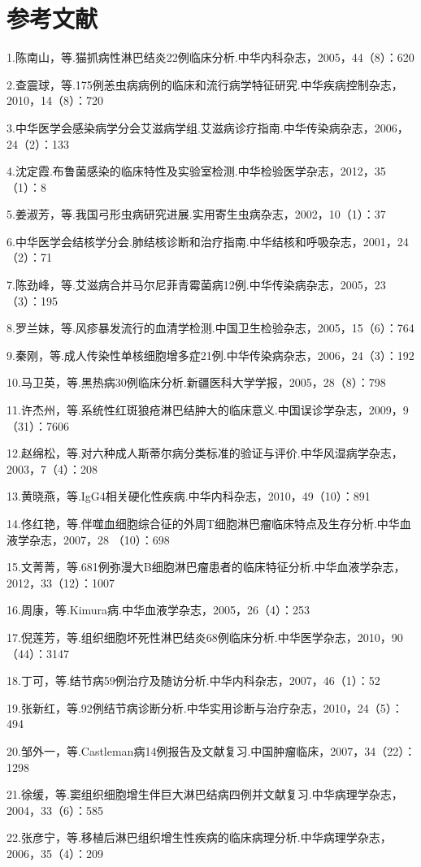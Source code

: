 \protect\hypertarget{text00255.html}{}{}

\section{参考文献}

1.陈南山，等.猫抓病性淋巴结炎22例临床分析.中华内科杂志，2005，44（8）：620

2.查震球，等.175例恙虫病病例的临床和流行病学特征研究.中华疾病控制杂志，2010，14（8）：720

3.中华医学会感染病学分会艾滋病学组.艾滋病诊疗指南.中华传染病杂志，2006，24（2）：133

4.沈定霞.布鲁菌感染的临床特性及实验室检测.中华检验医学杂志，2012，35（1）：8

5.姜淑芳，等.我国弓形虫病研究进展.实用寄生虫病杂志，2002，10（1）：37

6.中华医学会结核学分会.肺结核诊断和治疗指南.中华结核和呼吸杂志，2001，24（2）：71

7.陈劲峰，等.艾滋病合并马尔尼菲青霉菌病12例.中华传染病杂志，2005，23（3）：195

8.罗兰妹，等.风疹暴发流行的血清学检测.中国卫生检验杂志，2005，15（6）：764

9.秦刚，等.成人传染性单核细胞增多症21例.中华传染病杂志，2006，24（3）：192

10.马卫英，等.黑热病30例临床分析.新疆医科大学学报，2005，28（8）：798

11.许杰州，等.系统性红斑狼疮淋巴结肿大的临床意义.中国误诊学杂志，2009，9（31）：7606

12.赵绵松，等.对六种成人斯蒂尔病分类标准的验证与评价.中华风湿病学杂志，2003，7（4）：208

13.黄晓燕，等.IgG4相关硬化性疾病.中华内科杂志，2010，49（10）：891

14.佟红艳，等.伴噬血细胞综合征的外周T细胞淋巴瘤临床特点及生存分析.中华血液学杂志，2007，28
（10）：698

15.文菁菁，等.681例弥漫大B细胞淋巴瘤患者的临床特征分析.中华血液学杂志，2012，33（12）：1007

16.周康，等.Kimura病.中华血液学杂志，2005，26（4）：253

17.倪莲芳，等.组织细胞坏死性淋巴结炎68例临床分析.中华医学杂志，2010，90（44）：3147

18.丁可，等.结节病59例治疗及随访分析.中华内科杂志，2007，46（1）：52

19.张新红，等.92例结节病诊断分析.中华实用诊断与治疗杂志，2010，24（5）：494

20.邹外一，等.Castleman病14例报告及文献复习.中国肿瘤临床，2007，34（22）：1298

21.徐缓，等.窦组织细胞增生伴巨大淋巴结病四例并文献复习.中华病理学杂志，2004，33（6）：585

22.张彦宁，等.移植后淋巴组织增生性疾病的临床病理分析.中华病理学杂志，2006，35（4）：209

\protect\hypertarget{text00256.html}{}{}

